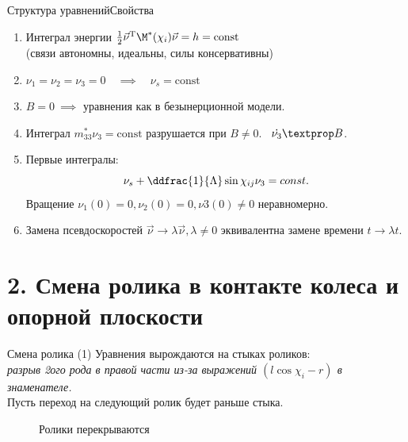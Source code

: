 \begin{frame}{Структура уравнений}{Свойства}    
\begin{enumerate}
    \item Интеграл энергии \quad $\frac{1}{2}\vec{\nu}^\mathrm{T}\M^*(\chi_i)\vec{\nu} = h = \mathrm{const}$\\
    (связи автономны, идеальны, силы консервативны)
    \item $\nu_1 = \nu_2 = \nu_3 = 0 \quad \implies \quad \nu_s = \mathrm{const}$
    \item $B = 0 \ \implies$ уравнения как в безынерционной модели.
    \item Интеграл $m_{33}^*\nu_3 = \mathrm{const}$ разрушается при $B \neq 0$. \ $\dot{\nu_3} \textprop B$.
    \item Первые интегралы:
    $$\nu_s + \ddfrac{1}{\Lambda}\sin\chi_{ij}\nu_3 = const.$$
    Вращение $\nu_1(0) = 0, \nu_2(0) = 0, \nu3(0) \neq 0$ неравномерно.
    \item Замена псевдоскоростей $\vec{\nu} \rightarrow \lambda\vec{\nu}, \lambda \neq 0$ эквивалентна замене времени $t \rightarrow \lambda t$.
\end{enumerate}
\end{frame}


\section{2. Смена ролика в контакте колеса и опорной плоскости}

\begin{frame}{Смена ролика}
    \textcolor{Periwinkle}{(1) Уравнения вырождаются на стыках роликов:}\\
    \textit{разрыв 2ого рода в правой части из-за выражений $(l\cos\chi_i-r)$ в знаменателе.} \\
    Пусть переход на следующий ролик будет раньше стыка.
    \begin{figure}
        \centering
        \caption{Ролики перекрываются}
    \end{figure}
\end{frame}

